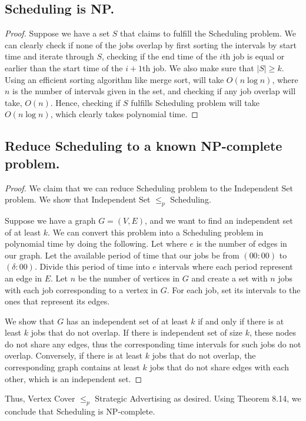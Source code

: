 \documentclass[11pt]{scrartcl}
\begin{document}
\subsection{
	Scheduling is NP.
}
\begin{proof}
	Suppose we have a set $S$ that claims to fulfill the Scheduling problem. 
	We can clearly check if none of the jobs overlap by first sorting the intervals by 
	start time and iterate through $S$, checking if the end time of the $i$th job is equal or earlier than 
	the start time of the $i+1$th job. We also make sure that $|S| \geq k$. 
	Using an efficient sorting algorithm like merge sort, will take $O(n\log n)$, where $n$ is the number of 
	intervals given in the set, 
	and checking if any job overlap will take, $O(n)$. Hence, checking if $S$ fulfills Scheduling problem
	will take $O(n\log n)$, which clearly takes polynomial time. 
\end{proof}


\subsection{
	Reduce Scheduling to a known NP-complete problem.
}
\begin{proof}
	We claim that we can reduce Scheduling problem to the Independent Set problem.
	We show that Independent Set $\leq_p$ Scheduling.

	Suppose we have a graph $G=(V,E)$, and we want to find an independent set of at least $k$.
	We can convert this problem into a Scheduling problem in polynomial time by doing the following.
	Let where $e$ is the number of edges in our graph. 
	Let the available period of time that our jobs be from $(00:00)$ to $(\delta:00)$.
	Divide this period of time into $e$ intervals where each period represent an edge in $E$.
	Let $n$ be the number of vertices in $G$ and create a set with $n$ jobs with each job 
	corresponding to a vertex in $G$. For each job, set its intervals to the ones that represent its edges. 
	
	We show that $G$ has an independent set of at least $k$ if and only if there is at least $k$ jobs that do not overlap. 
	If there is independent set of size $k$, these nodes do not share any edges, thus the corresponding 
	time intervals for such jobs do not overlap. Conversely, if there is at least $k$ jobs that do not overlap, 
	the corresponding graph contains at least $k$ jobs that do not share edges with each other, which is an independent set.  
\end{proof}


Thus, Vertex Cover $\leq_p$ Strategic Advertising as desired.
Using Theorem 8.14, we conclude that Scheduling is NP-complete.
\end{document}

